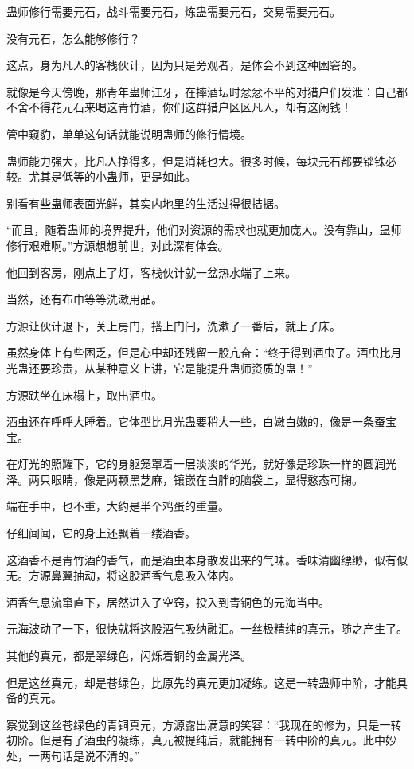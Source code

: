 \begin{this_body}
蛊师修行需要元石，战斗需要元石，炼蛊需要元石，交易需要元石。

没有元石，怎么能够修行？

这点，身为凡人的客栈伙计，因为只是旁观者，是体会不到这种困窘的。

就像是今天傍晚，那青年蛊师江牙，在摔酒坛时忿忿不平的对猎户们发泄：自己都不舍不得花元石来喝这青竹酒，你们这群猎户区区凡人，却有这闲钱！

管中窥豹，单单这句话就能说明蛊师的修行情境。

蛊师能力强大，比凡人挣得多，但是消耗也大。很多时候，每块元石都要锱铢必较。尤其是低等的小蛊师，更是如此。

别看有些蛊师表面光鲜，其实内地里的生活过得很拮据。

“而且，随着蛊师的境界提升，他们对资源的需求也就更加庞大。没有靠山，蛊师修行艰难啊。”方源想想前世，对此深有体会。

他回到客房，刚点上了灯，客栈伙计就一盆热水端了上来。

当然，还有布巾等等洗漱用品。

方源让伙计退下，关上房门，搭上门闩，洗漱了一番后，就上了床。

虽然身体上有些困乏，但是心中却还残留一股亢奋：“终于得到酒虫了。酒虫比月光蛊还要珍贵，从某种意义上讲，它是能提升蛊师资质的蛊！”

方源趺坐在床榻上，取出酒虫。

酒虫还在呼呼大睡着。它体型比月光蛊要稍大一些，白嫩白嫩的，像是一条蚕宝宝。

在灯光的照耀下，它的身躯笼罩着一层淡淡的华光，就好像是珍珠一样的圆润光泽。两只眼睛，像是两颗黑芝麻，镶嵌在白胖的脑袋上，显得憨态可掬。

端在手中，也不重，大约是半个鸡蛋的重量。

仔细闻闻，它的身上还飘着一缕酒香。

这酒香不是青竹酒的香气，而是酒虫本身散发出来的气味。香味清幽缥缈，似有似无。方源鼻翼抽动，将这股酒香气息吸入体内。

酒香气息流窜直下，居然进入了空窍，投入到青铜色的元海当中。

元海波动了一下，很快就将这股酒气吸纳融汇。一丝极精纯的真元，随之产生了。

其他的真元，都是翠绿色，闪烁着铜的金属光泽。

但是这丝真元，却是苍绿色，比原先的真元更加凝练。这是一转蛊师中阶，才能具备的真元。

察觉到这丝苍绿色的青铜真元，方源露出满意的笑容：“我现在的修为，只是一转初阶。但是有了酒虫的凝练，真元被提纯后，就能拥有一转中阶的真元。此中妙处，一两句话是说不清的。”


\end{this_body}

